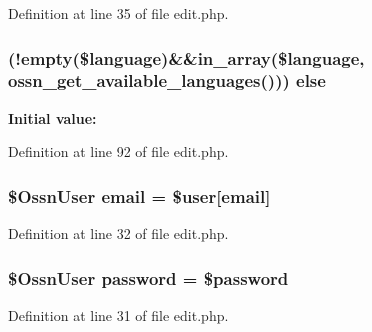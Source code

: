 Definition at line 35 of file edit.\+php.

\subsubsection[{\texorpdfstring{else}{else}}]{ (!empty(\$language)\&\&in\+\_\+array(\$language, {\bf ossn\+\_\+get\+\_\+available\+\_\+languages}())) else}\hypertarget{components_2_ossn_profile_2actions_2edit_8php_a74b55fd432ae5e4836bf30e96b38d3d6}{}\label{components_2_ossn_profile_2actions_2edit_8php_a74b55fd432ae5e4836bf30e96b38d3d6}
{\bfseries Initial value\+:}


Definition at line 92 of file edit.\+php.

\subsubsection[{\texorpdfstring{email}{email}}]{\setlength{\rightskip}{0pt plus 5cm}\${\bf Ossn\+User} email = \${\bf user}\mbox{[}\textquotesingle{}email\textquotesingle{}\mbox{]}}\hypertarget{components_2_ossn_profile_2actions_2edit_8php_a029df90d1a93ec9889cd9e166863617c}{}\label{components_2_ossn_profile_2actions_2edit_8php_a029df90d1a93ec9889cd9e166863617c}


Definition at line 32 of file edit.\+php.

\subsubsection[{\texorpdfstring{password}{password}}]{\setlength{\rightskip}{0pt plus 5cm}\${\bf Ossn\+User} password = \$password}\hypertarget{components_2_ossn_profile_2actions_2edit_8php_abec14e65dc912d61d2d443eb3533cd9f}{}\label{components_2_ossn_profile_2actions_2edit_8php_abec14e65dc912d61d2d443eb3533cd9f}


Definition at line 31 of file edit.\+php.

